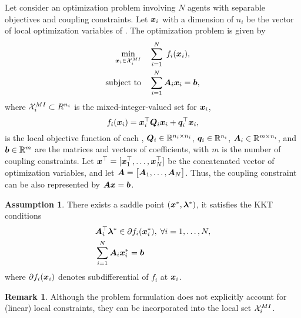 \documentclass[twocolumn,amsthm]{autart}%
\theoremstyle{definition}
\newtheorem{assumption}{Assumption}
\newtheorem{remark}{Remark}
\theoremstyle{plain}
\begin{document}
Let consider an optimization problem involving $N$ agents with separable objectives and coupling constraints.
Let $\boldsymbol{x}_i$ with a dimension of $n_i$ be the vector of local optimization variables of .
The optimization problem is given by
\begin{equation}
\begin{split}
\underset{\boldsymbol{x}_i \in \mathcal{X}_i^{\relax{MI}}}{\min} & \quad \sum_{i=1}^N \; f_i (\boldsymbol{x}_i), \\
\text{subject to} & \quad \sum_{i=1}^N \boldsymbol{A}_{i} \boldsymbol{x}_i = \boldsymbol{b}, \\
\end{split}
\end{equation}
where $\mathcal{X}_i^{\relax{MI}} \subset R^{n_i}$ is the mixed-integer-valued set for $\boldsymbol{x}_i$,
\[
f_i (\boldsymbol{x}_i) = \boldsymbol{x}_i^\top \boldsymbol{Q}_i \boldsymbol{x}_i + \boldsymbol{q}_i^\top \boldsymbol{x}_i,
\]
is the local objective function of each ,
${\boldsymbol{Q}_i \in \mathbb{R}^{n_i \times n_i}}$, $\boldsymbol{q}_i \in \mathbb{R}^{n_i}$, $\boldsymbol{A}_{i} \in \mathbb{R}^{m \times n_i}$, and $\boldsymbol{b} \in \mathbb{R}^{m}$ are the matrices and vectors of coefficients, with $m$ is the number of coupling constraints.
Let $\boldsymbol{x}^\top = [\boldsymbol{x}_1^\top, \dots, \boldsymbol{x}_N^\top]$ be the concatenated vector of optimization variables, and let
$\boldsymbol{A} = \big[ \boldsymbol{A}_1, \dots, \boldsymbol{A}_N \big]$.
Thus, the coupling constraint can be also represented by
${\boldsymbol{A} \boldsymbol{x} = \boldsymbol{b}}$.


\begin{assumption}
There exists a saddle point $(\boldsymbol{x}^{*}, \boldsymbol{\lambda}^{*})$, \ie it satisfies the KKT conditions
\begin{equation}
\begin{split}
& \boldsymbol{A}_i^\top \boldsymbol{\lambda}^{*} \in \partial f_i(\boldsymbol{x}_i^{*}),\; \forall i = 1, \dots, N, \\
& \sum_{i=1}^N \boldsymbol{A}_{i} \boldsymbol{x}^{*}_i = \boldsymbol{b}
\end{split}
\end{equation}
where $\partial f_i(\boldsymbol{x}_i)$ denotes subdifferential of $f_i$ at $\boldsymbol{x}_i$.
\end{assumption}

  
\begin{remark}
Although the problem formulation does not explicitly account for (linear) local constraints, they can be incorporated into the local set $\mathcal{X}_i^{\relax{MI}}$. 
\end{remark}
\end{document}
